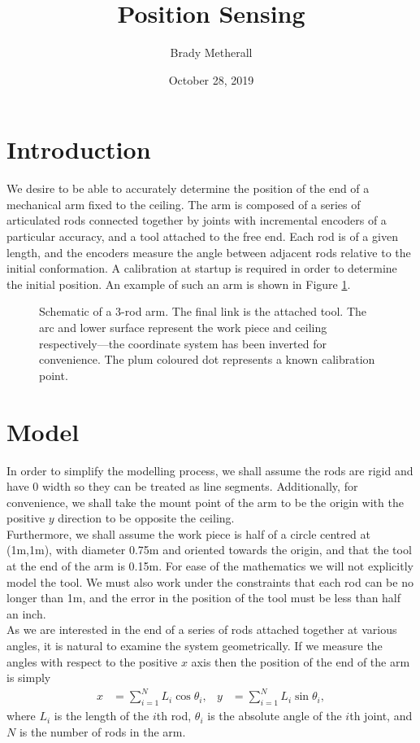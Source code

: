 \documentclass[12pt,a4paper]{article}
\title{Position Sensing}
\author{Brady Metherall}
\date{October 28, 2019}
\begin{document}
\maketitle

\section{Introduction}
We desire to be able to accurately determine the position of the end of a mechanical arm fixed to the ceiling. The arm is composed of a series of articulated rods connected together by joints with incremental encoders of a particular accuracy, and a tool attached to the free end. Each rod is of a given length, and the encoders measure the angle between adjacent rods relative to the initial conformation. A calibration at startup is required in order to determine the initial position. An example of such an arm is shown in Figure \ref{fig:scheme}.

\begin{figure}[tbp]
\centering

\caption{Schematic of a 3-rod arm. The final link is the attached tool. The arc and lower surface represent the work piece and ceiling respectively---the coordinate system has been inverted for convenience. The plum coloured dot represents a known calibration point.}
\label{fig:scheme}
\end{figure}

\section{Model}
\label{sec:model}
In order to simplify the modelling process, we shall assume the rods are rigid and have 0 width so they can be treated as line segments. Additionally, for convenience, we shall take the mount point of the arm to be the origin with the positive $y$ direction to be opposite the ceiling. \\

Furthermore, we shall assume the work piece is half of a circle centred at (1m,1m), with diameter 0.75m and oriented towards the origin, and that the tool at the end of the arm is 0.15m. For ease of the mathematics we will not explicitly model the tool. We must also work under the constraints that each rod can be no longer than 1m, and the error in the position of the tool must be less than half an inch. \\

As we are interested in the end of a series of rods attached together at various angles, it is natural to examine the system geometrically. If we measure the angles with respect to the positive $x$ axis then the position of the end of the arm is simply
\begin{align}
x &= \sum_{i=1}^N L_i \cos \theta_i, & y &= \sum_{i=1}^N L_i \sin \theta_i,
\label{eq:model}
\end{align}
where $L_i$ is the length of the $i$th rod, $\theta_i$ is the absolute angle of the $i$th joint, and $N$ is the number of rods in the arm.
\end{document}
